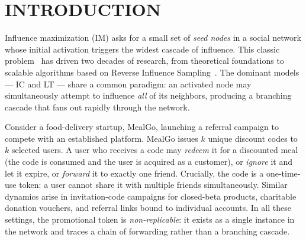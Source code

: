 \documentclass[sigconf]{acmart}
\begin{document}


\maketitle

\section{INTRODUCTION}
\label{sec:intro}

Influence maximization (IM) asks for a small set of \emph{seed nodes}
in a social network whose initial activation triggers the widest cascade
of influence.  This classic problem~\cite{domingos2001mining,kempe2003maximizing}
has driven two decades of research, from theoretical foundations to
scalable algorithms based on Reverse Influence
Sampling~\cite{borgs2014maximizing,tang2015influence}.
The dominant models — IC and LT — share a common paradigm: an activated
node may simultaneously attempt to influence \emph{all} of its neighbors,
producing a branching cascade that fans out rapidly through the network.

Consider a food-delivery startup, MealGo, launching a referral campaign
to compete with an established platform.  MealGo issues $k$ unique
discount codes to $k$ selected users.  A user who receives a code may
\emph{redeem} it for a discounted meal (the code is consumed and the
user is acquired as a customer), or \emph{ignore} it and let it expire,
or \emph{forward} it to exactly one friend.
Crucially, the code is a one-time-use token: a user cannot share it
with multiple friends simultaneously.  Similar dynamics arise in
invitation-code campaigns for closed-beta products, charitable donation
vouchers, and referral links bound to individual accounts.
In all these settings, the promotional token is \emph{non-replicable}:
it exists as a single instance in the network and traces a
chain of forwarding rather than a branching cascade.
\end{document}
